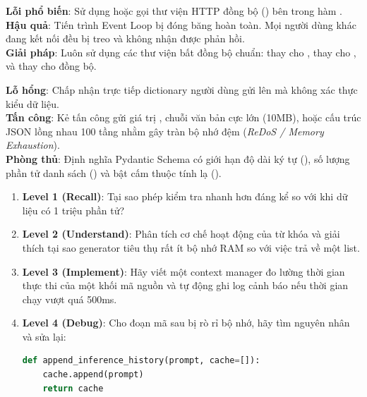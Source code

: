 \begin{debugbox}
\textbf{Lỗi phổ biến}: Sử dụng  hoặc gọi thư viện HTTP đồng bộ () bên trong hàm .\\
\textbf{Hậu quả}: Tiến trình Event Loop bị đóng băng hoàn toàn. Mọi người dùng khác đang kết nối đều bị treo và không nhận được phản hồi.\\
\textbf{Giải pháp}: Luôn sử dụng các thư viện bất đồng bộ chuẩn:  thay cho ,  thay cho , và  thay cho  đồng bộ.
\end{debugbox}

\begin{securitybox}
\textbf{Lỗ hổng}: Chấp nhận trực tiếp dictionary người dùng gửi lên mà không xác thực kiểu dữ liệu.\\
\textbf{Tấn công}: Kẻ tấn công gửi giá trị , chuỗi văn bản cực lớn (10MB), hoặc cấu trúc JSON lồng nhau 100 tầng nhằm gây tràn bộ nhớ đệm (\textit{ReDoS / Memory Exhaustion}).\\
\textbf{Phòng thủ}: Định nghĩa Pydantic Schema có giới hạn độ dài ký tự (), số lượng phần tử danh sách () và bật cấm thuộc tính lạ ().
\end{securitybox}

\begin{exercisebox}
\begin{enumerate}
  \item \textbf{Level 1 (Recall)}: Tại sao phép kiểm tra  nhanh hơn đáng kể so với  khi dữ liệu có 1 triệu phần tử?
  \item \textbf{Level 2 (Understand)}: Phân tích cơ chế hoạt động của từ khóa  và giải thích tại sao generator tiêu thụ rất ít bộ nhớ RAM so với việc trả về một list.
  \item \textbf{Level 3 (Implement)}: Hãy viết một context manager  đo lường thời gian thực thi của một khối mã nguồn và tự động ghi log cảnh báo nếu thời gian chạy vượt quá 500ms.
  \item \textbf{Level 4 (Debug)}: Cho đoạn mã sau bị rò rỉ bộ nhớ, hãy tìm nguyên nhân và sửa lại:
\begin{lstlisting}[language=Python]
def append_inference_history(prompt, cache=[]):
    cache.append(prompt)
    return cache
\end{lstlisting}
\end{enumerate}
\end{exercisebox}

